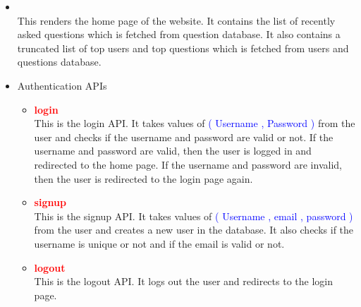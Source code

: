 \documentclass{article}
\begin{document}
\begin{itemize}
    \item \textcolor{red}{\textbf{\textfractionsolidus}} \\ This renders the home page of the website.
    It contains the list of recently asked questions which is fetched from question database. It also contains a truncated list of top users and top questions which is fetched from users and questions database.
    \item Authentication APIs
    \begin{itemize}
        \item \textcolor{red}{\textbf{ \textfractionsolidus login}}  \\ This is the login API. It takes values of \textcolor{blue}{( Username , Password )} from the user and checks if the username and password are valid or not. If the username and password are valid, then the user is logged in and redirected to the home page. If the username and password are invalid, then the user is redirected to the login page again.
        \item \textcolor{red}{\textbf{ \textfractionsolidus signup}} \\ This is the signup API. It takes values of \textcolor{blue}{( Username , email , password )} from the user and creates a new user in the database. It also checks if the username is unique or not and if the email is valid or not.
        \item \textcolor{red}{\textbf{ \textfractionsolidus logout}} \\ This is the logout API. It logs out the user and redirects to the login page.
    \end{itemize}
    

\end{itemize}
\end{document}
